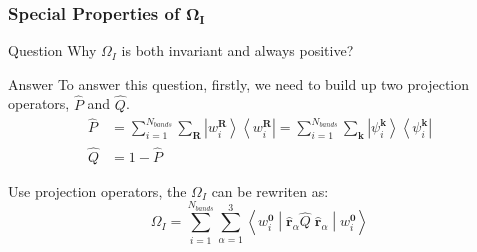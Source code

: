 \documentclass{beamer}
\begin{document}
  \begin{frame}
    \frametitle{Special Properties of \(\mathbf{\Omega_I}\)}

    \begin{alertblock}{Question}
      Why \(\Omega_I\) is both invariant and always positive? 
    \end{alertblock}

    \begin{block}{Answer}
      To answer this question, firstly, we need to build up two projection operators, \(\widehat{P}\) and \(\widehat{Q}\). 
      \begin{subequations}
        \begin{align}
          \widehat{P} &= \sum_{i=1}^{N_{bands}}\sum_{\mathbf{R}}\left|w_i^{\mathbf{R}}\right\rangle\left\langle{}w_i^{\mathbf{R}}\right| = \sum_{i=1}^{N_{bands}}\sum_{\mathbf{k}}\left|\psi_i^{\mathbf{k}}\right\rangle\left\langle{}\psi_i^{\mathbf{k}}\right|\\
          \widehat{Q} &= 1 - \widehat{P}
        \end{align}
      \end{subequations}

      Use projection operators, the \(\Omega_I\) can be rewriten as:
      \begin{equation}
        \Omega_I = \sum_{i=1}^{N_{bands}}\sum_{\alpha=1}^3\left\langle{}w_i^{\mathbf{0}}\middle|\widehat{\mathbf{r}}_\alpha\widehat{Q}\;\widehat{\mathbf{r}}_\alpha\middle|{}w_i^\mathbf{0}\right\rangle
      \end{equation} 
    \end{block}

  \end{frame}
\end{document}
